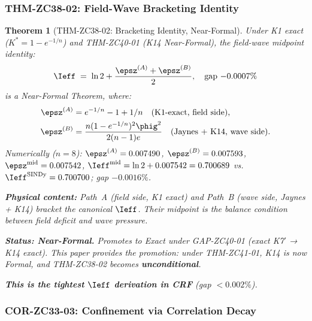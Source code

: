 \documentclass[12pt, a4paper]{article}
\newtheorem{theorem}{Theorem}[section]
\begin{document}
\subsubsection{THM-ZC38-02: Field-Wave Bracketing Identity}
\label{sec:thm-zc38-02}

\begin{theorem}[THM-ZC38-02: Bracketing Identity, Near-Formal]
\label{thm:zc38-02}
Under K1 exact ($K^* = 1 - e^{-1/n}$) and THM-ZC40-01
(K14 Near-Formal), the field-wave midpoint identity:
\[
  \Ieff
  \;=\; \ln 2
    + \frac{\epsz^{(A)} + \epsz^{(B)}}{2},
  \quad\text{gap }{-0.0007\%}
\]
is a Near-Formal Theorem, where:
\begin{align*}
  \epsz^{(A)} &= e^{-1/n} - 1 + 1/n \quad\text{(K1-exact, field side)},\\
  \epsz^{(B)} &= \frac{n(1-e^{-1/n})^2\phig^2}{2(n-1)e}
               \quad\text{(Jaynes + K14, wave side)}.
\end{align*}
Numerically ($n = 8$):
$\epsz^{(A)} = 0.007490$,
$\epsz^{(B)} = 0.007593$,
$\epsz^{\rm mid} = 0.007542$,
$\Ieff^{\rm mid} = \ln 2 + 0.007542 = 0.700689$
vs.\ $\Ieff^{\rm SINDy} = 0.700700$; gap $-0.0016\%$.

\medskip\noindent\textbf{Physical content:}
Path~A (field side, K1 exact) and Path~B (wave side, Jaynes + K14)
bracket the canonical $\Ieff$.
Their midpoint is the balance condition between field deficit and
wave pressure.

\medskip\noindent\textbf{Status: Near-Formal.}
Promotes to Exact under GAP-ZC40-01 (exact K7$'$ → K14 exact).
This paper provides the promotion: under THM-ZC41-01, K14 is
now Formal, and THM-ZC38-02 becomes \textbf{unconditional}.

\medskip\noindent\textbf{This is the tightest $\Ieff$ derivation
in CRF} (gap $< 0.002\%$).
\end{theorem}

\subsubsection{COR-ZC33-03: Confinement via Correlation Decay}
\label{sec:cor-zc33-03}
\end{document}
